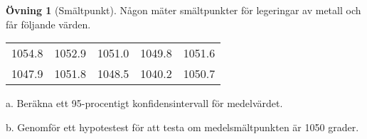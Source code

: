 \documentclass[
]{book}
\theoremstyle{definition}
\theoremstyle{definition}
\theoremstyle{definition}
\newtheorem{exercise}{Övning}[chapter]
\theoremstyle{definition}
\theoremstyle{remark}
\begin{document}
\begin{exercise}[Smältpunkt]
Någon mäter smältpunkter för legeringar av metall och får följande värden.

\begin{table}
\centering
\begin{tabular}[t]{rrrrr}
\toprule
1054.8 & 1052.9 & 1051.0 & 1049.8 & 1051.6\\
1047.9 & 1051.8 & 1048.5 & 1040.2 & 1050.7\\
\bottomrule
\end{tabular}
\end{table}

a. Beräkna ett 95-procentigt konfidensintervall för medelvärdet.

b. Genomför ett hypotestest för att testa om medelsmältpunkten är 1050 grader.
\end{exercise}
\end{document}
